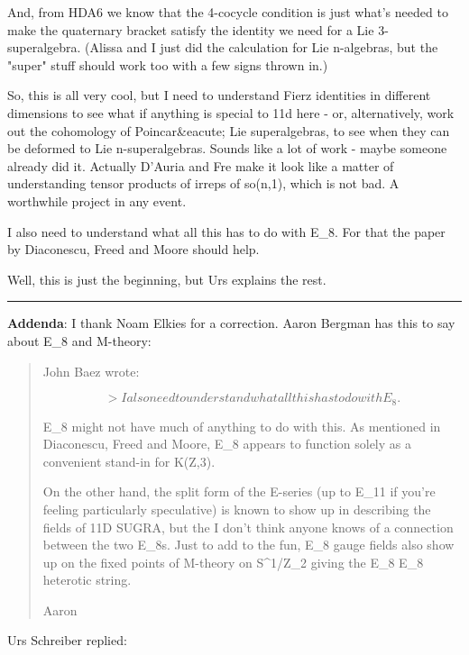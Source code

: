 And, from HDA6 we know that the 4-cocycle condition is just 
what's needed to make the quaternary bracket satisfy the identity
we need for a Lie 3-superalgebra.  (Alissa and I just did the
calculation for Lie n-algebras, but the "super" stuff should work
too with a few signs thrown in.)

So, this is all very cool, but I need to understand Fierz identities
in different dimensions to see what if anything is special to
11d here - or, alternatively, work out the cohomology of Poincar&eacute;
Lie superalgebras, to see when they can be deformed to Lie 
n-superalgebras.  Sounds like a lot of work - maybe someone already
did it.  Actually D'Auria and Fre make it look like a matter of
understanding tensor products of irreps of so(n,1), which is not bad.
A worthwhile project in any event.

I also need to understand what all this has to do with E_{8}.
For that the paper by Diaconescu, Freed and Moore should help.

Well, this is just the beginning, but Urs explains the rest.

\par\noindent\rule{\textwidth}{0.4pt}
\textbf{Addenda}: I thank Noam Elkies for a correction.  Aaron
Bergman has this to say about E_{8} and M-theory:

\begin{quote}
John Baez wrote:


$$

> I also need to understand what all this has to do with E_{8}.
$$
    

E_{8} might not have much of anything to do with this. As mentioned in
Diaconescu, Freed and Moore, E_{8} appears to function solely as a
convenient stand-in for K(Z,3).

On the other hand, the split form of the E-series (up to
E_{11} if you're feeling particularly speculative) is known to
show up in describing the fields of 11D SUGRA, but the I don't think
anyone knows of a connection between the two E_{8}s. Just to
add to the fun, E_{8} gauge fields also show up on the fixed
points of M-theory on S^{1}/Z_{2} giving the
E_{8} \times  E_{8} heterotic string. 

Aaron
\end{quote}

Urs Schreiber replied:

